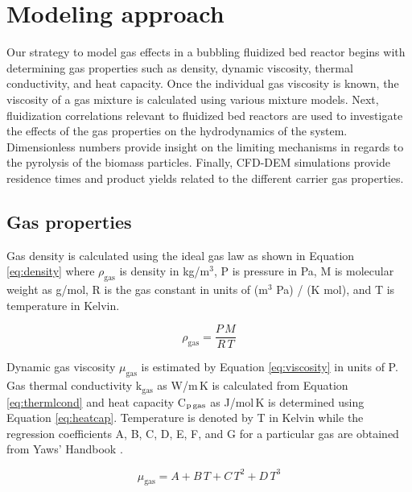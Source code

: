 
\section{Modeling approach}

Our strategy to model gas effects in a bubbling fluidized bed reactor begins with determining gas properties such as density, dynamic viscosity, thermal conductivity, and heat capacity. Once the individual gas viscosity is known, the viscosity of a gas mixture is calculated using various mixture models. Next, fluidization correlations relevant to fluidized bed reactors are used to investigate the effects of the gas properties on the hydrodynamics of the system. Dimensionless numbers provide insight on the limiting mechanisms in regards to the pyrolysis of the biomass particles. Finally, CFD-DEM simulations provide residence times and product yields related to the different carrier gas properties.


\subsection{Gas properties}

Gas density is calculated using the ideal gas law as shown in Equation \ref{eq:density} where $\rho_\text{gas}$ is density in kg/m$^3$, P is pressure in Pa, M is molecular weight as g/mol, R is the gas constant in units of (m$^3$ Pa) / (K mol), and T is temperature in Kelvin.

\begin{equation}\label{eq:density}
    \rho_\text{gas} = \frac{P\,M}{R\,T}
\end{equation}

Dynamic gas viscosity $\mu_\text{gas}$ is estimated by Equation \ref{eq:viscosity} in units of \textmugreek P. Gas thermal conductivity k$_\text{gas}$ as W/m\,K is calculated from Equation \ref{eq:thermlcond} and heat capacity C$_\text{p\,gas}$ as J/mol\,K is determined using Equation \ref{eq:heatcap}. Temperature is denoted by T in Kelvin while the regression coefficients A, B, C, D, E, F, and G for a particular gas are obtained from Yaws' Handbook \cite{Yaws2014}.

\begin{equation}\label{eq:viscosity}
    \mu_\text{gas} = A + B\,T + C\,T^2 + D\,T^3
\end{equation}

